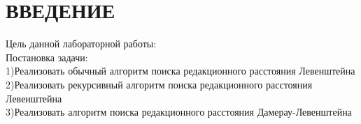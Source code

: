 \newpage
\section*{ВВЕДЕНИЕ}
Цель данной лабораторной работы:\\
Постановка задачи:\\
1)Реализовать обычный алгоритм поиска редакционного расстояния Левенштейна\\
2)Реализовать рекурсивный алгоритм поиска редакционного расстояния Левенштейна\\
3)Реализовать алгоритм поиска редакционного расстояния Дамерау-Левенштейна\\